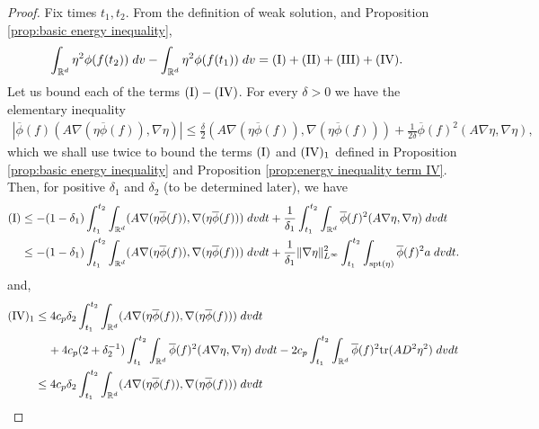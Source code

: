 \documentclass[12pt,american]{amsart}
\numberwithin{equation}{section}
\theoremstyle{plain}
\theoremstyle{definition}                  %
\def\tr{\textnormal{tr}}
\begin{document}
  \begin{proof}
    Fix times $t_1,t_2$. From the definition of weak solution, and Proposition \ref{prop:basic energy inequality},
    \begin{align}\label{eqn:energy inequality basic expression}	
      \int_{\mathbb{R}^d}\eta^2 \phi(f(t_2))\;dv-\int_{\mathbb{R}^d}\eta^2 \phi(f(t_1))\;dv & = \textnormal{(I)}+\textnormal{(II)}+\textnormal{(III)}+\textnormal{(IV)}.	
    \end{align}	
    Let us bound each of the terms $\textnormal{(I)}-\textnormal{(IV)}$.  For every $\delta>0$ we have the elementary inequality	
    \begin{align*}
      |\overline{\phi}(f)(A\nabla (\eta \overline{\phi}(f)),\nabla \eta)| \leq \frac{\delta}{2}(A\nabla (\eta \overline{\phi}(f)),\nabla (\eta \overline{\phi}(f)))+ \frac{1}{2\delta}\overline{\phi}(f)^2(A\nabla \eta,\nabla \eta),
    \end{align*}
    which we shall use twice to bound the terms $(\textnormal{I})$ and $(\textnormal{IV})_1$ defined in Proposition \ref{prop:basic energy inequality} and Proposition \ref{prop:energy inequality term IV}. Then, for positive $\delta_1$ and $\delta_2$ (to be determined later), we have
    \begin{align*}
      (\textnormal{I}) & \leq -(1-\delta_1)\int_{t_1}^{t_2}\int_{\mathbb{R}^d}(A\nabla (\eta \overline{\phi}(f)),\nabla (\eta \overline{\phi}(f)))\;dvdt+\frac{1}{\delta_1}\int_{t_1}^{t_2}\int_{\mathbb{R}^d}\overline{\phi}(f)^2(A\nabla \eta,\nabla \eta)\;dvdt\\
      & \leq -(1-\delta_1)\int_{t_1}^{t_2}\int_{\mathbb{R}^d}(A\nabla (\eta \overline{\phi}(f)),\nabla (\eta \overline{\phi}(f)))\;dvdt+\frac{1}{\delta_1}\|\nabla \eta\|_{L^\infty}^2 \int_{t_1}^{t_2}\int_{\textnormal{spt}(\eta)}\overline{\phi}(f)^2a\;dvdt.	
    \end{align*}
    and,
    \begin{align*}  
      (\textnormal{IV})_1 & \leq 4c_p\delta_2 \int_{t_1}^{t_2}\int_{\mathbb{R}^d}(A\nabla (\eta \overline{\phi}(f)),\nabla (\eta \overline{\phi}(f)) )\;dvdt\\
  	&\;\;\;\; +4c_p(2+\delta_2^{-1}) \int_{t_1}^{t_2}\int_{\mathbb{R}^d}\overline{\phi}(f)^2(A\nabla \eta,\nabla \eta)\;dvdt-2c_p\int_{t_1}^{t_2}\int_{\mathbb{R}^d}\overline{\phi}(f)^2\tr(AD^2\eta^2)\;dvdt\\
      & \leq 4c_p \delta_2 \int_{t_1}^{t_2}\int_{\mathbb{R}^d}(A\nabla (\eta \overline{\phi}(f)),\nabla (\eta \overline{\phi}(f)) )\;dvdt\\

\end{align*}
\end{proof}
\end{document}
